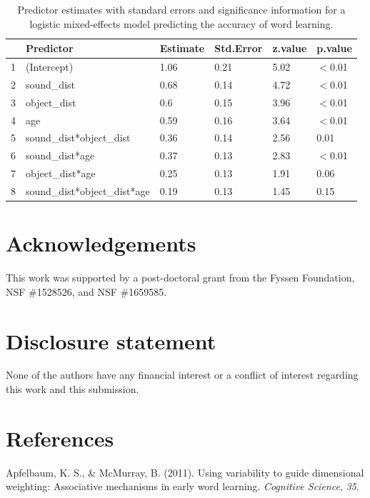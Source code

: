 \documentclass[english,,man,floatsintext]{apa6}
\theoremstyle{definition}
\theoremstyle{definition}
\theoremstyle{definition}
\theoremstyle{remark}
\begin{document}
\begin{table}[ht]
\centering
\begin{tabular}{rlllll}
  \hline
 & Predictor & Estimate & Std.Error & z.value & p.value \\ 
  \hline
1 & (Intercept) & 1.06 & 0.21 & 5.02 & $<$0.01 \\ 
  2 & sound\_dist & 0.68 & 0.14 & 4.72 & $<$0.01 \\ 
  3 & object\_dist & 0.6 & 0.15 & 3.96 & $<$0.01 \\ 
  4 & age & 0.59 & 0.16 & 3.64 & $<$0.01 \\ 
  5 & sound\_dist*object\_dist & 0.36 & 0.14 & 2.56 & 0.01 \\ 
  6 & sound\_dist*age & 0.37 & 0.13 & 2.83 & $<$0.01 \\ 
  7 & object\_dist*age & 0.25 & 0.13 & 1.91 & 0.06 \\ 
  8 & sound\_dist*object\_dist*age & 0.19 & 0.13 & 1.45 & 0.15 \\ 
   \hline
\end{tabular}
\caption{Predictor estimates with standard errors and significance information for a logistic mixed-effects model predicting the accuracy of word learning.} 
\end{table}

\section{Acknowledgements}\label{acknowledgements}

This work was supported by a post-doctoral grant from the Fyssen
Foundation, NSF \#1528526, and NSF \#1659585.

\section{Disclosure statement}\label{disclosure-statement}

None of the authors have any financial interest or a conflict of
interest regarding this work and this submission.

\section{References}\label{references}

\setlength{\parindent}{-0.5in} \setlength{\leftskip}{0.5in}

\hypertarget{refs}{}
\hypertarget{ref-apfelbaum2011}{}
Apfelbaum, K. S., \& McMurray, B. (2011). Using variability to guide
dimensional weighting: Associative mechanisms in early word learning.
\emph{Cognitive Science}, \emph{35}.
\end{document}
